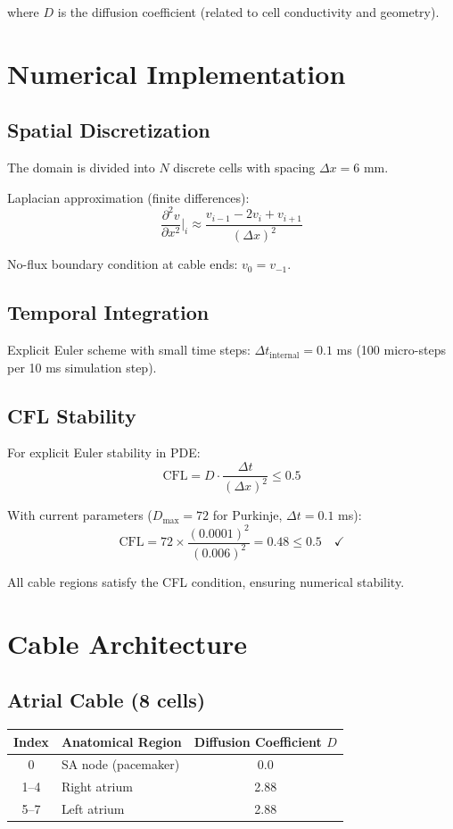 \documentclass[12pt]{book}
\begin{document}
where $D$ is the diffusion coefficient (related to cell conductivity and geometry).

\section{Numerical Implementation}

\subsection{Spatial Discretization}

The domain is divided into $N$ discrete cells with spacing $\Delta x = 6$ mm.

Laplacian approximation (finite differences):
$$\frac{\partial^2 v}{\partial x^2}\bigg|_i \approx \frac{v_{i-1} - 2v_i + v_{i+1}}{(\Delta x)^2}$$

No-flux boundary condition at cable ends: $v_0 = v_{-1}$.

\subsection{Temporal Integration}

Explicit Euler scheme with small time steps: $\Delta t_{\text{internal}} = 0.1$ ms (100 micro-steps per 10 ms simulation step).

\subsection{CFL Stability}

For explicit Euler stability in PDE:
$$\text{CFL} = D \cdot \frac{\Delta t}{(\Delta x)^2} \leq 0.5$$

With current parameters ($D_{\max} = 72$ for Purkinje, $\Delta t = 0.1$ ms):
$$\text{CFL} = 72 \times \frac{(0.0001)^2}{(0.006)^2} = 0.48 \leq 0.5 \quad \checkmark$$

All cable regions satisfy the CFL condition, ensuring numerical stability.

\section{Cable Architecture}

\subsection{Atrial Cable (8 cells)}

\begin{tabular}{|c|l|c|}
\hline
Index & Anatomical Region & Diffusion Coefficient $D$ \\
\hline
0 & SA node (pacemaker) & 0.0 \\
1--4 & Right atrium & 2.88 \\
5--7 & Left atrium & 2.88 \\
\hline
\end{tabular}
\end{document}
